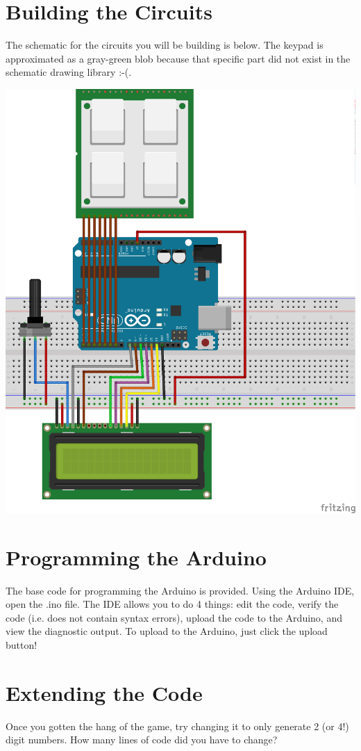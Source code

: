 \documentclass{article}
\begin{document}
\newpage

\section{Building the Circuits}
The schematic for the circuits you will be building is below. The keypad is
approximated as a gray-green blob because that specific part did not exist in the
schematic drawing library :-(.

\includegraphics[width=\textwidth]{exp6-bagels_bb.png}

\section{Programming the Arduino}
The base code for programming the Arduino is provided. Using the Arduino IDE, open
the .ino file.  The IDE allows you to do 4 things: edit the code, verify the code
(i.e. does not contain syntax errors), upload the code to the Arduino, and view the
diagnostic output. To upload to the Arduino, just click the upload button!

\section{Extending the Code}

Once you gotten the hang of the game, try changing it to only generate 2 (or 4!)
digit numbers. How many lines of code did you have to change?
\end{document}

